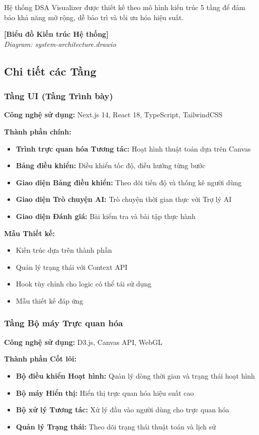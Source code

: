 Hệ thống DSA Visualizer được thiết kế theo mô hình kiến trúc 5 tầng để đảm bảo khả năng mở rộng, dễ bảo trì và tối ưu hóa hiệu suất.

\begin{center}
\textbf{[Biểu đồ Kiến trúc Hệ thống]}\\
\textit{Diagram: system-architecture.drawio}
\end{center}

\subsection{Chi tiết các Tầng}

\subsubsection{Tầng UI (Tầng Trình bày)}
\textbf{Công nghệ sử dụng:} Next.js 14, React 18, TypeScript, TailwindCSS

\textbf{Thành phần chính:}
\begin{itemize}
    \item \textbf{Trình trực quan hóa Tương tác:} Hoạt hình thuật toán dựa trên Canvas
    \item \textbf{Bảng điều khiển:} Điều khiển tốc độ, điều hướng từng bước
    \item \textbf{Giao diện Bảng điều khiển:} Theo dõi tiến độ và thống kê người dùng
    \item \textbf{Giao diện Trò chuyện AI:} Trò chuyện thời gian thực với Trợ lý AI
    \item \textbf{Giao diện Đánh giá:} Bài kiểm tra và bài tập thực hành
\end{itemize}

\textbf{Mẫu Thiết kế:}
\begin{itemize}
    \item Kiến trúc dựa trên thành phần
    \item Quản lý trạng thái với Context API
    \item Hook tùy chỉnh cho logic có thể tái sử dụng
    \item Mẫu thiết kế đáp ứng
\end{itemize}

\subsubsection{Tầng Bộ máy Trực quan hóa}
\textbf{Công nghệ sử dụng:} D3.js, Canvas API, WebGL

\textbf{Thành phần Cốt lõi:}
\begin{itemize}
    \item \textbf{Bộ điều khiển Hoạt hình:} Quản lý dòng thời gian và trạng thái hoạt hình
    \item \textbf{Bộ máy Hiển thị:} Hiển thị trực quan hóa hiệu suất cao
    \item \textbf{Bộ xử lý Tương tác:} Xử lý đầu vào người dùng cho trực quan hóa
    \item \textbf{Quản lý Trạng thái:} Theo dõi trạng thái thuật toán và lịch sử
\end{itemize}

